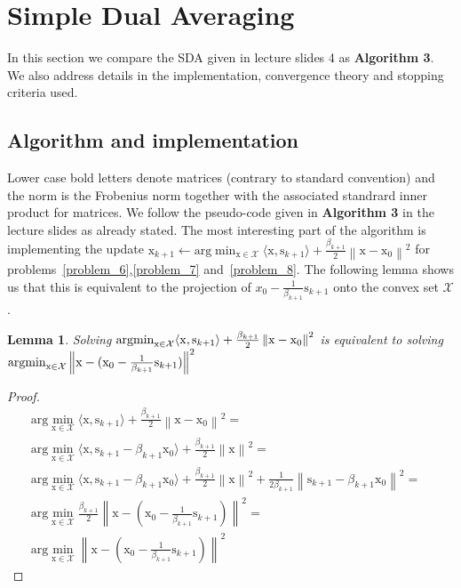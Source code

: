\documentclass{article}
\newcommand{\0}{\mathrm{0}}
\newcommand{\1}{\mathrm{1}}
\newcommand{\s}{\mathrm{s}}
\newcommand{\x}{\mathrm{x}}
\newcommand{\norm}[1]{\left\| #1 \right\|}
\newtheorem{lemma}[theorem]{Lemma}
\begin{document}
\section{Simple Dual Averaging}
In this section we compare the SDA given in lecture slides 4 as \textbf{Algorithm 3}. We also address details in the implementation, convergence theory and stopping criteria used.
\subsection{Algorithm and implementation}
Lower case bold letters denote matrices (contrary to standard convention) and the norm is the Frobenius norm together with the associated standrard inner product for matrices. We follow the pseudo-code given in \textbf{Algorithm 3} in the lecture slides as already stated. The most interesting part of the algorithm is implementing the update $\x_{k+1} \leftarrow \text{arg}\min_{\x\in\mathcal{X}} \langle \x,\s_{k+1}\rangle + \frac{\beta_{k+1}}{2}\norm{\x - \x_0}^2$ for problems~\ref{problem_6},\ref{problem_7} and~\ref{problem_8}. The following lemma shows us that this is equivalent to the projection of $x_0 - \frac{1}{\beta_{k+1}}\s_{k+1}$ onto the convex set $\mathcal{X}$.
\begin{lemma}
  Solving $\text{\normalfont argmin}_{\x\in\mathcal{X}} \langle \x,\s_{k+1}\rangle + \frac{\beta_{k+1}}{2}\norm{\x - \x_0}^2$ is equivalent to solving $\text{\normalfont argmin}_{\x\in\mathcal{X}}\norm{\x - (\x_0 - \frac{1}{\beta_{k+1}}\s_{k+1})}^2$
\end{lemma}
\begin{proof}
  \begin{equation}
    \begin{aligned}
      \text{arg}\min_{\x\in\mathcal{X}} \langle \x,\s_{k+1}\rangle + \frac{\beta_{k+1}}{2}\norm{\x - \x_0}^2 = &\\
      \text{arg}\min_{\x\in\mathcal{X}} \langle \x,\s_{k+1} - \beta_{k+1}\x_0\rangle + \frac{\beta_{k+1}}{2}\norm{\x}^2 = &\\
      \text{arg}\min_{\x\in\mathcal{X}} \langle \x,\s_{k+1}- \beta_{k+1}\x_0\rangle + \frac{\beta_{k+1}}{2}\norm{\x }^2 + \frac{1}{2\beta_{k+1}}\norm{\s_{k+1} - \beta_{k+1}\x_0}^2 = &\\
      \text{arg}\min_{\x\in\mathcal{X}}\frac{\beta_{k+1}}{2}\norm{\x - (\x_0 - \frac{1}{\beta_{k+1}}\s_{k+1})}^2 = &\\
      \text{arg}\min_{\x\in\mathcal{X}}\norm{\x - (\x_0 - \frac{1}{\beta_{k+1}}\s_{k+1})}^2 \;\;\;\; &
    \end{aligned}
  \end{equation}
\end{proof}
\end{document}

